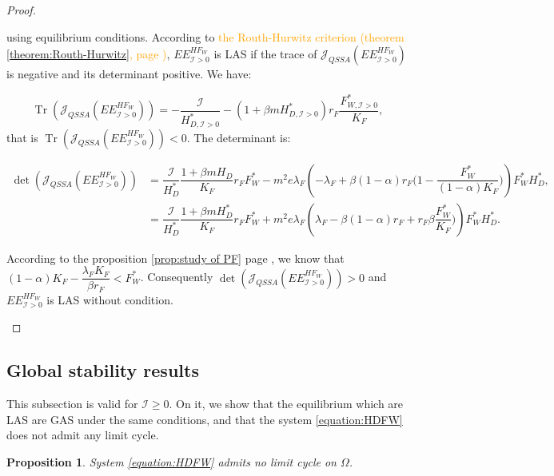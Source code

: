 \documentclass{article}
\newcommand{\lfw}{\lambda_{F}}
\newcommand{\lfw}{\lambda_{F}}
\newcommand{\cI}{\mathcal{I}}
\newcommand{\vdeux}[1]{\textcolor{orange}{#1}}
\DeclareMathOperator{\Tr}{Tr}
\newtheorem{prop}[theorem]{Proposition}
\theoremstyle{definition}
\theoremstyle{remark}
\begin{document}
\begin{proof}
\begin{itemize}
using equilibrium conditions.  According to \vdeux{the Routh-Hurwitz criterion (theorem \ref{theorem:Routh-Hurwitz}, page \pageref{theorem:Routh-Hurwitz})},  $EE^{HF_W}_{\cI > 0}$ is LAS if the trace of $\mathcal{J}_{QSSA}(EE^{HF_W}_{\cI > 0}) $ is negative and its determinant positive. We have:

\begin{equation*}
\Tr(\mathcal{J}_{QSSA}(EE^{HF_W}_{\cI > 0})) = -\dfrac{\cI}{H^*_{D, \cI > 0}} -(1+\beta m H^*_{D, \cI > 0}) r_F \dfrac{F^*_{W, \cI > 0}}{K_F}, 
\end{equation*}
that is $\Tr(\mathcal{J}_{QSSA}(EE^{HF_W}_{\cI > 0})) < 0$.
The determinant is:

\begin{align*}
\det(\mathcal{J}_{QSSA}(EE^{HF_W}_{\cI > 0})) &= \dfrac{\cI}{H_D^*} \dfrac{1 + \beta m H_D}{K_F} r_F F_W^* - m^2 e \lfw \left(-\lfw + \beta(1-\alpha)r_F \Big(1- \dfrac{F_W^*}{(1-\alpha) K_F} \Big) \right) F_W^* H_D^*, \\
&= \dfrac{\cI}{H_D^*} \dfrac{1 + \beta m H_D^*}{K_F} r_F F_W^* + m^2 e \lfw \left(\lfw - \beta(1-\alpha)r_F + r_F \beta\dfrac{F_W^*}{ K_F} \Big) \right) F_W^* H_D^*.
\end{align*}

According to the proposition \ref{prop:study of PF} page \pageref{prop:study of PF}, we know that $(1-\alpha)K_F - \dfrac{\lfw K_F}{\beta r_F} < F_W^*$. Consequently $\det(\mathcal{J}_{QSSA}(EE^{HF_W}_{\cI > 0})) > 0$ and $EE^{HF_W}_{\cI > 0}$ is LAS without condition.
\end{itemize}
\end{proof}

\subsection{Global stability results}
This subsection is valid for $\cI \geq 0$. On it, we show that the equilibrium which are LAS are GAS under the same conditions, and that the system \eqref{equation:HDFW} does not admit any limit cycle. 

\begin{prop} \label{prop:no limit cycle, 2D}
System \eqref{equation:HDFW} admits no limit cycle on $\Omega$.
\end{prop}
\end{document}
